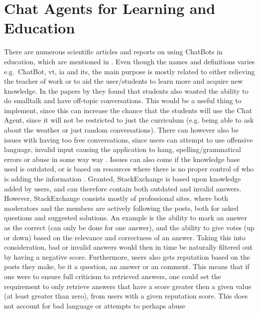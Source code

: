 \section{Chat Agents for Learning and Education}
\label{chapter3:learning_with_chatbots}
There are numerous scientific articles and reports on using ChatBots in education, which are mentioned in 
 \cite{Crutzen2011,Kerly2008,Knill2004,Kowalski2013,Jia2009,Gulenko,Imran2014,Kerly2007,Reed2011,Rossi2011}. Even though the names and definitions varies e.g.~ChatBot, \gls{vt}, 
\gls{ia} and \gls{its}, the main purpose is mostly related to either relieving the teacher of work or to aid the user/students to learn more and acquire new knowledge. In the 
papers by \cite{Kerly2008,Kerly2007,Knill2004} they found that students also wanted the ability to do smalltalk and have off-topic conversations. This would be a useful thing to implement, 
since this can increase the chance that the students will use the Chat Agent, since it will not be restricted to just the curriculum (e.g. being able to ask about the weather 
or just random conversations). There can however also be issues with having too free conversations, since users can attempt to use offensive language, invalid input causing 
the application to hang, spelling/grammatical errors or abuse in some way way \cite{Kerly2008}. Issues can also come if the knowledge base used is outdated, or is based on resources 
where there is no proper control of who is adding the information \cite{Knill2004,Imran2014,Reed2011}.
\vspace{0.5em}\newline
Granted, StackExchange is based upon knowledge added by users, and can therefore contain both outdated and invalid answers. However, StackExchange consists mostly of professional 
sites, where both moderators and the members are actively following the posts, both for asked questions and suggested solutions. An example is the ability to mark an answer as 
the correct (can only be done for one answer), and the ability to give votes (up or down) based on the relevance and correctness of an answer. Taking this into consideration, 
bad or invalid answers would then in time be naturally filtered out by having a negative score. Furthermore, users also gets reputation based on the posts they make, be it a 
question, an answer or an comment. This means that if one were to ensure full criticism to retrieved answers, one could set the requirement to only retrieve answers that have 
a score greater then a given value (at least greater than zero), from users with a given reputation score. This does not account for bad language or attempts to perhaps abuse 
